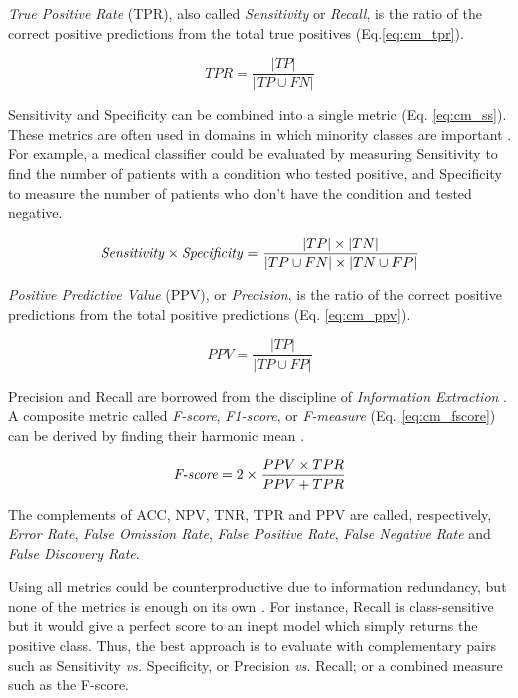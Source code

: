 \textit{True Positive Rate} (TPR), also called \textit{Sensitivity} or \textit{Recall}, is the ratio of the correct positive predictions from the total true positives (Eq.\ref{eq:cm_tpr}).

\begin{equation}
\label{eq:cm_tpr}
TPR = \frac{|TP|}{|TP \cup FN|}
\end{equation}

Sensitivity and Specificity can be combined into a single metric (Eq. \ref{eq:cm_ss}). These metrics are often used in  domains in which minority classes are important \citep{kuhn2013applied}. For example, a medical classifier \citep{el2010hybrid} could be evaluated by measuring Sensitivity to find the number of patients with a condition who tested positive, and Specificity to measure the number of patients who don't have the condition and tested negative.

\begin{equation}
\label{eq:cm_ss}
\textnormal{\textit{Sensitivity}} \times \textnormal{\textit{Specificity}} = \frac{|TP| \times |TN|}{|TP \cup FN| \times |TN \cup FP|}
\end{equation}

\textit{Positive Predictive Value} (PPV), or \textit{Precision}, is the ratio of the correct positive predictions from the total positive predictions (Eq. \ref{eq:cm_ppv}).

\begin{equation}
\label{eq:cm_ppv}
PPV = \frac{|TP|}{|TP \cup FP|}
\end{equation}

Precision and Recall are borrowed from the discipline of \textit{Information Extraction} \citep{sokolova2009systematic}. A composite metric called \textit{F-score}, \textit{F1-score}, or \textit{F-measure} (Eq. \ref{eq:cm_fscore}) can be derived by finding their harmonic mean \citep{kelleher2015fundamentals}.

\begin{equation}
\label{eq:cm_fscore}
\textnormal{\textit{F-score}} = 2 \times \frac{PPV \times TPR}{PPV + TPR}
\end{equation}

The complements of ACC, NPV, TNR, TPR and PPV are called, respectively, \textit{Error Rate}, \textit{False Omission Rate}, \textit{False Positive Rate}, \textit{False Negative Rate} and \textit{False Discovery Rate}.

Using all metrics could be counterproductive due to information redundancy, but none of the metrics is enough on its own \citep{ma2007adequate}. For instance, Recall is class-sensitive but it would give a perfect score to an inept model which simply returns the positive class. Thus, the best approach is to evaluate with complementary pairs \citep{gu2009evaluation} such as Sensitivity \textit{vs.} Specificity, or Precision \textit{vs.} Recall; or a combined measure such as the F-score.


